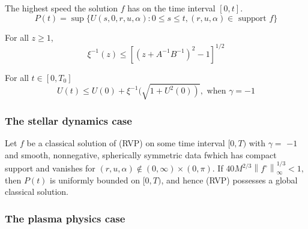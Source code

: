 \begin{definition}
The highest speed the solution $f$ has on the time interval $[0,t]$.
$$
P(t)=\sup \{U(s, 0, r, u, \alpha): 0 \leq s \leq t,(r, u, \alpha) \in \text { support } f\}
$$
\end{definition}


\begin{lemma}
For all $z \geq 1$,
$$
\xi^{-1}(z) \leq\left[\left(z+A^{-1} B^{-1}\right)^{2}-1\right]^{1 / 2}
$$
\end{lemma}

\begin{lemma}
For all $t \in\left[0, T_{0}\right]$
$$
U(t) \leq U(0)+\xi^{-1}(\sqrt{\left.1+U^{2}(0)\right)}, \text { when } \gamma=-1
$$
\end{lemma}

\subsubsection{The stellar dynamics case}

\begin{theorem}
Let $f$ be a classical solution of (RVP) on some time interval $[0, T)$ with $\gamma=$
$-1$ and smooth, nonnegative, spherically symmetric data fwhich has compact support
and vanishes for $(r, u, \alpha) \notin(0, \infty) \times(0, \pi) .$ If $40 M^{2 / 3}\left\|f^{\circ}\right\|_{\infty}^{1 / 3}<1,$ then $P(t)$ is uniformly bounded on $[0, T)$, and hence (RVP) possesses a global classical solution.
\end{theorem}

\subsubsection{The plasma physics case}

